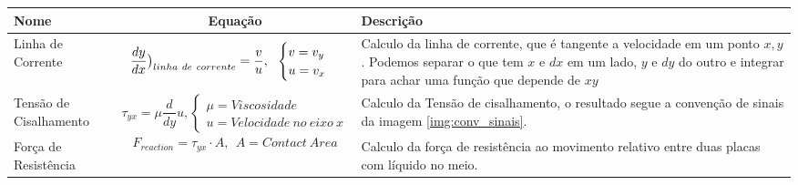 \documentclass{article}
\begin{document}
\begin{table}[h]\tiny
    \begin{tabularx}{\textwidth}{|l|c|X|}\hline
        \textbf{Nome}                          & \textbf{Equação}                                                                                              & \textbf{Descrição}                                                       \\ \hline

        \rule{0pt}{10ex} Linha de Corrente     & \begin{minipage}{0.5\textwidth}
                                                     $$\frac{dy}{dx} \big{)}_{linha \ de \ corrente} = \frac{v}{u}, \ \ \begin{cases}
                    v = v_y \\
                    u = v_x
                \end{cases}$$
                                                 \end{minipage} & Calculo da linha de corrente, que é tangente a velocidade em um ponto $x,y$. Podemos separar o que tem $x$ e $dx$ em um lado, $y$ e $dy$ do outro e integrar para achar
        uma função que depende de $xy$                                                                                                                                                                                                    \\[5ex] \hline

        \rule{0pt}{8ex} Tensão de Cisalhamento &
        \begin{minipage}{0.5 \textwidth}
            $$\tau_{yx} = \mu \frac{d}{dy} u, \begin{cases}
                    \mu = Viscosidade \\
                    u = Velocidade \ no \ eixo \ x
                \end{cases}$$
        \end{minipage}

                                               & Calculo da Tensão de cisalhamento, o resultado segue a convenção de sinais da imagem \ref{img:conv_sinais}.                                                                              \\[5ex] \hline

        \rule{0pt}{8ex} Força de Resistência   &
        \begin{minipage}{0.5 \textwidth}
            $$F_{reaction} = \tau_{yx} \cdot A, \ \ A= Contact \ Area$$
        \end{minipage}
                                               & Calculo da força de resistência ao movimento relativo entre duas placas com líquido no meio.                                                                                             \\[5ex] \hline
    \end{tabularx}


\end{table}
\end{document}
